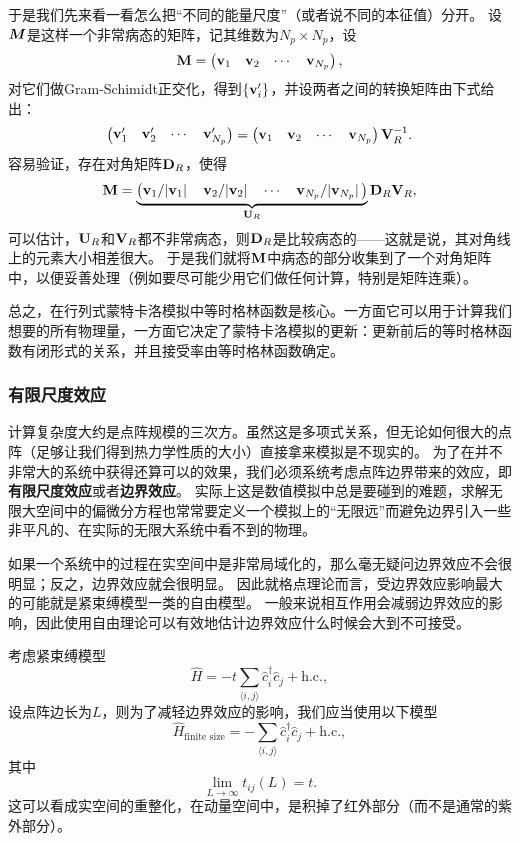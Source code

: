 \documentclass[hyperref, UTF8, a4paper]{ctexart}
\newcommand*{\pair}[1]{\langle #1 \rangle}
\newcommand*{\concept}[1]{{\textbf{#1}}}
\begin{document}
于是我们先来看一看怎么把“不同的能量尺度”（或者说不同的本征值）分开。
设$\vb*{M}$是这样一个非常病态的矩阵，记其维数为$N_p \times N_p$，设
\begin{equation}
    \vb{M} = \pmqty{\vb{v}_1 & \vb{v}_2 & \cdots & \vb{v}_{N_p}},
\end{equation}
对它们做Gram-Schimidt正交化，得到$\{\vb{v}_i'\}$，并设两者之间的转换矩阵由下式给出：
\begin{equation}
    \pmqty{\vb{v}'_1 & \vb{v}'_2 & \cdots & \vb{v}'_{N_p}} = \pmqty{\vb{v}_1 & \vb{v}_2 & \cdots & \vb{v}_{N_p}} \vb{V}_R^{-1}.
\end{equation}
容易验证，存在对角矩阵$\vb{D}_R$，使得
\begin{equation}
    \vb{M} = \underbrace{\pmqty{\vb{v}_1 / \abs*{\vb{v}_1} & \vb{v}_2 / \abs*{\vb{v}_2} & \cdots & \vb{v}_{N_p} / \abs*{\vb{v}_{N_p}}}}_{\vb{U}_R} \vb{D}_R \vb{V}_R,
\end{equation}
可以估计，$\vb{U}_R$和$\vb{V}_R$都不非常病态，则$\vb{D}_R$是比较病态的——这就是说，其对角线上的元素大小相差很大。
于是我们就将$\vb{M}$中病态的部分收集到了一个对角矩阵中，以便妥善处理（例如要尽可能少用它们做任何计算，特别是矩阵连乘）。

总之，在行列式蒙特卡洛模拟中等时格林函数是核心。一方面它可以用于计算我们想要的所有物理量，一方面它决定了蒙特卡洛模拟的更新：更新前后的等时格林函数有闭形式的关系，并且接受率由等时格林函数确定。

\subsubsection{有限尺度效应}

计算复杂度大约是点阵规模的三次方。虽然这是多项式关系，但无论如何很大的点阵（足够让我们得到热力学性质的大小）直接拿来模拟是不现实的。
为了在并不非常大的系统中获得还算可以的效果，我们必须系统考虑点阵边界带来的效应，即\concept{有限尺度效应}或者\concept{边界效应}。
实际上这是数值模拟中总是要碰到的难题，求解无限大空间中的偏微分方程也常常要定义一个模拟上的“无限远”而避免边界引入一些非平凡的、在实际的无限大系统中看不到的物理。

如果一个系统中的过程在实空间中是非常局域化的，那么毫无疑问边界效应不会很明显；反之，边界效应就会很明显。
因此就格点理论而言，受边界效应影响最大的可能就是紧束缚模型一类的自由模型。
一般来说相互作用会减弱边界效应的影响，因此使用自由理论可以有效地估计边界效应什么时候会大到不可接受。

考虑紧束缚模型
\begin{equation}
    \hat{H} = - t \sum_{\pair{i, j}} \hat{c}_i^\dagger \hat{c}_j + \text{h.c.},
\end{equation}
设点阵边长为$L$，则为了减轻边界效应的影响，我们应当使用以下模型
\begin{equation}
    \hat{H}_\text{finite size} = - \sum_{\pair{i, j}}  \hat{c}_i^\dagger \hat{c}_j + \text{h.c.},
\end{equation}
其中
\begin{equation}
    \lim_{L \to \infty} t_{ij}(L) = t.
\end{equation}
这可以看成实空间的重整化，在动量空间中，是积掉了红外部分（而不是通常的紫外部分）。
\end{document}
